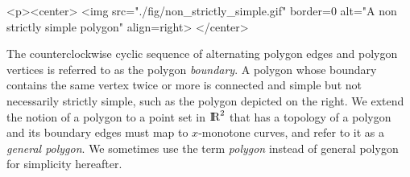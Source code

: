 \lcTex{%
  \setlength{\widthRight}{1.4cm}
  \setlength{\widthLeft}{\widthLineReal}
  \addtolength{\widthLeft}{-\widthRight}
  \begin{minipage}{\widthLeft}
}
\label{fig:non_strictly_simple_polygon}
\begin{ccHtmlOnly}
  <p><center>
    <img src="./fig/non_strictly_simple.gif" border=0 alt="A non strictly simple polygon" align=right>
  </center>
\end{ccHtmlOnly}
The counterclockwise cyclic sequence of alternating polygon edges and
polygon vertices is referred to as the polygon {\em boundary}.
A polygon whose boundary contains the same vertex twice or more is connected
and simple but not necessarily strictly simple, such as the polygon depicted
on the right.  We extend the notion of a polygon to a point set in ${\rm I\!\hspace{-0.025em} R}^2$
that has  a topology of a polygon and its boundary edges must map to
$x$-monotone curves, and refer to it as a {\em general polygon}. We sometimes use
the term {\em polygon} instead of general polygon for simplicity hereafter.

